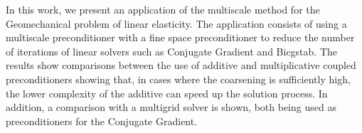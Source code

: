 \begin{foreignabstract}



In this work, we present an application of the multiscale method for the Geomechanical problem of linear elasticity. The application consists of using a multiscale preconditioner with a fine space preconditioner to reduce the number of iterations of linear solvers such as Conjugate Gradient and Bicgstab. The results show comparisons between the use of additive and multiplicative coupled preconditioners showing that, in cases where the coarsening is sufficiently high, the lower complexity of the additive can speed up the solution process. In addition, a comparison with a multigrid solver is shown, both  being used as preconditioners for the Conjugate Gradient.
\end{foreignabstract}

